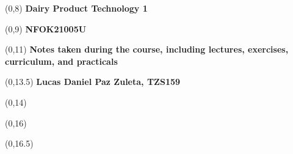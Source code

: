 \begin{titlepage}

    
    \begin{textblock}{9.4}(0,8)
        \Huge{\selectfont\bfseries{Dairy Product Technology 1}}
    \end{textblock}
    \begin{textblock}{9.4}(0,9)
        \Huge{\selectfont\bfseries{NFOK21005U}}
    \end{textblock}
    
    \begin{textblock}{9.4}(0,11)
        \LARGE{\selectfont\bfseries{Notes taken during the course, including lectures, exercises, curriculum, and practicals}}
    \end{textblock}
    
    \begin{textblock}{9.4}(0,13.5)
        \large{\selectfont\bfseries{
        Lucas Daniel Paz Zuleta, TZS159}}
    \end{textblock}
    
    \begin{textblock}{9.4}(0,14)
        \large{\selectfont{MSc student at the University of Copenhagen}}
    \end{textblock}
    
    \begin{textblock}{9.4}(0,16)
        \large{\selectfont{Last compiled: \today}}
    \end{textblock}
    
    \begin{textblock}{8.4}(0,16.5)
        \large{}
    \end{textblock}
    

\end{titlepage}
